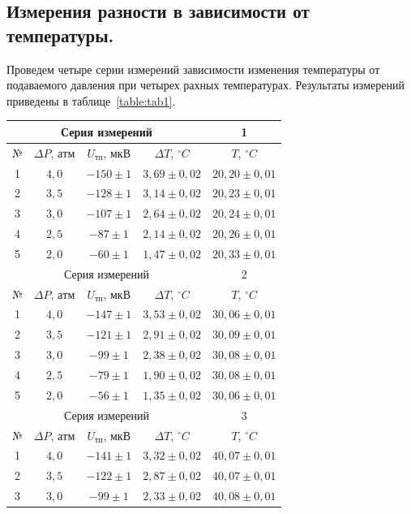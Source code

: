 \documentclass[a4paper,11pt]{article}
\begin{document}
\subsection{Измерения разности в зависимости от температуры.}
Проведем четыре серии измерений зависимости изменения температуры от подаваемого давления при четырех рахных температурах. Результаты измерений приведены в таблице~\ref{table:tab1}.
\begin{table}[h!]
\centering
\begin{tabular}{ ||c|c|c|c|c|| }
  \hline
  \multicolumn{4}{||c|}{Серия измерений} & 1 \\
  \hline
  № & $\Delta P$, $атм$ & $U_{тп}$, $мкВ$ & $\Delta T$, $^{\circ}C$ & $T$, $^{\circ}C$ \\
  \hline
  1 & $4,0$ & $-150 \pm 1$ & $3,69 \pm 0,02$ & $20,20 \pm 0,01$ \\
  2 & $3,5$ & $-128 \pm 1$ & $3,14 \pm 0,02$ & $20,23 \pm 0,01$ \\
  3 & $3,0$ & $-107 \pm 1$ & $2,64 \pm 0,02$ & $20,24 \pm 0,01$ \\
  4 & $2,5$ &  $-87 \pm 1$ & $2,14 \pm 0,02$ & $20,26 \pm 0,01$ \\
  5 & $2,0$ &  $-60 \pm 1$ & $1,47 \pm 0,02$ & $20,33 \pm 0,01$ \\
  \hline
  \hline
  \multicolumn{4}{||c|}{Серия измерений} & 2 \\
  \hline
  № & $\Delta P$, $атм$ & $U_{тп}$, $мкВ$ & $\Delta T$, $^{\circ}C$ & $T$, $^{\circ}C$ \\
  \hline
  1 & $4,0$ & $-147 \pm 1$ & $3,53 \pm 0,02$ & $30,06 \pm 0,01$ \\
  2 & $3,5$ & $-121 \pm 1$ & $2,91 \pm 0,02$ & $30,09 \pm 0,01$ \\
  3 & $3,0$ &  $-99 \pm 1$ & $2,38 \pm 0,02$ & $30,08 \pm 0,01$ \\
  4 & $2,5$ &  $-79 \pm 1$ & $1,90 \pm 0,02$ & $30,08 \pm 0,01$ \\
  5 & $2,0$ &  $-56 \pm 1$ & $1,35 \pm 0,02$ & $30,06 \pm 0,01$ \\
  \hline
  \hline
  \multicolumn{4}{||c|}{Серия измерений} & 3 \\
  \hline
  № & $\Delta P$, $атм$ & $U_{тп}$, $мкВ$ & $\Delta T$, $^{\circ}C$ & $T$, $^{\circ}C$ \\
  \hline
  1 & $4,0$ & $-141 \pm 1$ & $3,32 \pm 0,02$ & $40,07 \pm 0,01$ \\
  2 & $3,5$ & $-122 \pm 1$ & $2,87 \pm 0,02$ & $40,07 \pm 0,01$ \\
  3 & $3,0$ &  $-99 \pm 1$ & $2,33 \pm 0,02$ & $40,08 \pm 0,01$ \\

\end{tabular}
\end{table}
\end{document}
